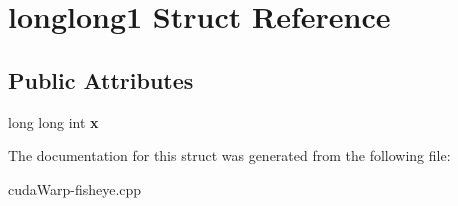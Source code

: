 \hypertarget{structlonglong1}{}\section{longlong1 Struct Reference}
\label{structlonglong1}
\subsection*{Public Attributes}
\begin{DoxyCompactItemize}
\item 
long long int {\bfseries x}\hypertarget{structlonglong1_a33d2f3214ca1163651aaaefa1bc0875d}{}\label{structlonglong1_a33d2f3214ca1163651aaaefa1bc0875d}

\end{DoxyCompactItemize}


The documentation for this struct was generated from the following file\+:\begin{DoxyCompactItemize}
\item 
cuda\+Warp-\/fisheye.\+cpp\end{DoxyCompactItemize}
